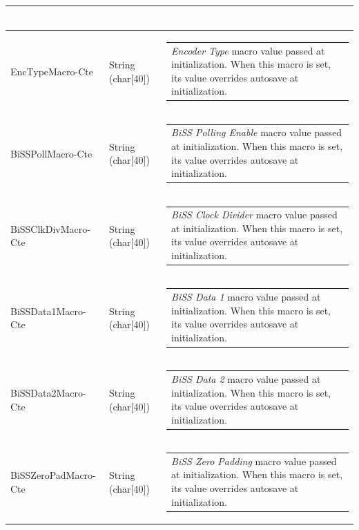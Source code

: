 \documentclass[openany]{article}
\begin{document}
\begin{longtable}{| m{4.5cm} m{2.5cm}  m{8.5cm} |}
\begin{tabular}{@{}m{6cm}@{}}
            \end{tabular} \hypertarget{pv:enc-type-macro-cte}{}\\ \hline
        EncTypeMacro-Cte & String (char[40]) & \begin{tabular}{@{}m{6cm}@{}}
                \emph{Encoder Type} macro value passed at initialization. When this macro is set, its value overrides autosave at initialization.
            \end{tabular} \hypertarget{pv:biss-poll-macro-cte}{}\\ \hline
        BiSSPollMacro-Cte & String (char[40]) & \begin{tabular}{@{}m{6cm}@{}}
                \emph{BiSS Polling Enable} macro value passed at initialization. When this macro is set, its value overrides autosave at initialization.
            \end{tabular} \hypertarget{pv:biss-clk-div-macro-cte}{}\\ \hline
        BiSSClkDivMacro-Cte & String (char[40]) & \begin{tabular}{@{}m{6cm}@{}}
                \emph{BiSS Clock Divider} macro value passed at initialization. When this macro is set, its value overrides autosave at initialization.
            \end{tabular} \hypertarget{pv:biss-data-1--macro-cte}{}\\ \hline
        BiSSData1Macro-Cte & String (char[40]) & \begin{tabular}{@{}m{6cm}@{}}
                \emph{BiSS Data 1} macro value passed at initialization. When this macro is set, its value overrides autosave at initialization.
            \end{tabular} \hypertarget{pv:biss-data-2-macro-cte}{}\\ \hline
        BiSSData2Macro-Cte & String (char[40]) & \begin{tabular}{@{}m{6cm}@{}}
                \emph{BiSS Data 2} macro value passed at initialization. When this macro is set, its value overrides autosave at initialization.
            \end{tabular} \hypertarget{pv:biss-zero-pad-macro-cte}{}\\ \hline
        BiSSZeroPadMacro-Cte & String (char[40]) & \begin{tabular}{@{}m{6cm}@{}}
                \emph{BiSS Zero Padding} macro value passed at initialization. When this macro is set, its value overrides autosave at initialization.

\end{tabular}
\end{longtable}
\end{document}
